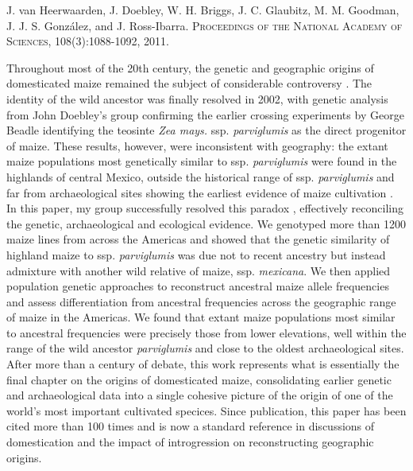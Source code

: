 \documentclass[11pt,letterpaper]{article}
\begin{document}
\large{ 
J. van Heerwaarden, J. Doebley, W. H. Briggs, J. C. Glaubitz, M. M. Goodman, J. J. S. Gonz\'{a}lez, and J. Ross-Ibarra. 
\textsc{Proceedings of the National Academy of Sciences}, 108(3):1088-1092, 2011.}

\vspace{1cm}

\noindent Throughout most of the 20th century, the genetic and geographic origins of domesticated maize remained the subject of considerable controversy \citep{doebley2004genetics}. 
The identity of the wild ancestor was finally resolved in 2002, with genetic analysis from John Doebley's group \citep{matsuoka2002single} confirming the earlier crossing experiments by George Beadle \citep{beadle1972mystery} identifying the teosinte \emph{Zea mays.} ssp. \emph{parviglumis} as the direct progenitor of maize. 
These results, however, were inconsistent with geography: the extant maize populations most genetically similar to ssp. \emph{parviglumis} were found in the highlands of central Mexico, outside the historical range of ssp. \emph{parviglumis} \citep{hufford2012inferences} and far from archaeological sites showing the earliest evidence of maize cultivation \citep{hastorf2009rio, piperno2009starch, pohl2007microfossil}.
In this paper, my group successfully resolved this paradox \citep{van2011genetic}, effectively reconciling the genetic, archaeological and ecological evidence.
We genotyped more than 1200 maize lines from across the Americas and showed that the genetic similarity of highland maize to ssp. \emph{parviglumis} was due not to recent ancestry but instead admixture with another wild relative of maize, ssp. \emph{mexicana}.
We then applied population genetic approaches to reconstruct ancestral maize allele frequencies and assess differentiation from ancestral frequencies across the geographic range of maize in the Americas.
We found that extant maize populations most similar to ancestral frequencies were precisely those from lower elevations, well within the range of the wild ancestor \emph{parviglumis} and close to the oldest archaeological sites.\\

\noindent After more than a century of debate, this work represents what is essentially the final chapter on the origins of domesticated maize, consolidating earlier genetic and archaeological data into a single cohesive picture of the origin of one of the world's most important cultivated specices.
Since publication, this paper has been cited more than 100 times and is now a standard reference in discussions of domestication and the impact of introgression on reconstructing geographic origins.


\end{document}
